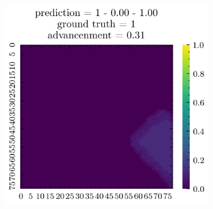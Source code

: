 \begin{figure}[H]
\begin{subfigure}[b]{0.19\textwidth}
    \end{subfigure}  
    \begin{subfigure}[b]{0.19\textwidth}
        \includegraphics[width=\linewidth]{../img/5/quarry/best/patch-2d-4.png}
    \end{subfigure}  


\end{figure}
